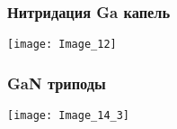 \begin{frame}
	\frametitle{Нитридация Ga капель}
	\centering
	\texttt{[image: Image\_12]} \\
	\vfill
	\begin{minipage}[t]{0.4\linewidth}
	\end{minipage}
	\begin{minipage}[t]{0.4\linewidth}
	\end{minipage}
\end{frame}

\begin{frame}
	\frametitle{GaN триподы}
	\centering
	\begin{minipage}[t]{0.2\linewidth}
	\end{minipage}
	\begin{minipage}[t]{0.2\linewidth}
	\end{minipage}
	\begin{minipage}[t]{0.2\linewidth}
	\end{minipage}
	\begin{minipage}[t]{0.2\linewidth}
	\end{minipage}
\bigskip
\texttt{[image: Image\_14\_3]}
\end{frame}

